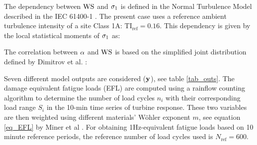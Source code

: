 \documentclass[preprint,12pt]{elsarticle}
\begin{document}
The dependency between $\text{WS}$ and $\sigma_{1}$ is defined in the Normal Turbulence Model described in the IEC 61400-1 \cite{international2005iec}. The present case uses a reference ambient turbulence intensity of a site Class 1A:  $\text{TI}_{\text{ref}} = 0.16$. This dependency is given by the local statistical moments of $\sigma_{1}$ as:


\noindent %
%


The correlation between $\alpha$ and $\text{WS}$ is based on the simplified joint distribution defined by Dimitrov et al. \cite{dimitrov2015model}:



Seven different model outputs are considered ($\mathbf{y}$), see table \ref{tab_outs}. The damage equivalent fatigue loads (EFL) are computed using a rainflow counting algorithm to determine the number of load cycles $n_i$  with their corresponding load range $S_i$  in the 10-min time series of turbine response. These two variables are then weighted using different materials' W{\"o}hler exponent $m$, see equation \ref{eq_EFL} by Miner et al \cite{miner1945cumulative}. For obtaining 1Hz-equivalent fatigue loads based on 10 minute reference periods, the reference number of load cycles used is $N_{\text{ref}}=600$.
\end{document}
